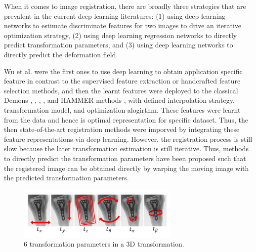 \documentclass{report}
\begin{document}
	When it comes to image registration, there are broadly three strategies that are prevalent in the current deep learning literatures: (1) using deep learning networks to estimate discriminate features for two images to drive an iterative optimization strategy, (2) using deep learning regression networks to directly predict transformation parameters, and (3) using deep learning networks to directly predict the deformation field. \cite{Litjens_2017}
	
	Wu et al. \cite{7314894} \cite{Wu} were the first ones to use deep learning to obtain application specific feature in contrast to the supervised feature extraction or handcrafted feature selection methods, and then the learnt features were deployed to the classical Demons \cite{VERCAUTEREN2009S61}, \cite{10.1007/10704282_64}, \cite{10.1007/978-3-540-85990-1_117}, \cite{10.1007/978-3-642-24446-9_3}, \cite{Peyrat} and HAMMER methods \cite{Wu2010TPSHAMMERIH}, \cite{Shen} with defined interpolation strategy, transformation model, and optimization alogirthm. These features were learnt from the data and hence is optimal representation for specific dataset. Thus, the then state-of-the-art registration methods were imporved by integrating these feature representations via deep learning. However, the registration process is still slow because the later transformation estimation is still iterative. Thus, methods to directly predict the transformation parameters have been proposed such that the registered image can be obtained directly by warping the moving image with the predicted transformation parameters.
	
	\begin{figure}[H]
	\centering
	\includegraphics[width=0.7\textwidth]{resources/chapter2/tx_parameters.png}
	\caption{6 transformation parameters in a 3D transformation. \cite{7393571}}
	\label{fig:tx_parameters}
	\end{figure}
	
	
\end{document}
